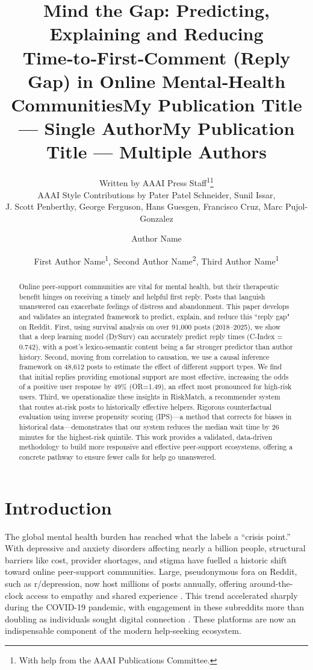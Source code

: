 \documentclass[letterpaper]{article} %
\title{Mind the Gap: Predicting, Explaining and Reducing Time‑to‑First‑Comment (Reply Gap) in Online Mental‑Health Communities}
\author{
    Written by AAAI Press Staff\textsuperscript{\rm 1}\thanks{With help from the AAAI Publications Committee.}\\
    AAAI Style Contributions by Pater Patel Schneider,
    Sunil Issar,\\
    J. Scott Penberthy,
    George Ferguson,
    Hans Guesgen,
    Francisco Cruz\equalcontrib,
    Marc Pujol-Gonzalez\equalcontrib
}
\title{My Publication Title --- Single Author}
\author {
    Author Name
}
\title{My Publication Title --- Multiple Authors}
\author {
    First Author Name\textsuperscript{\rm 1},
    Second Author Name\textsuperscript{\rm 2},
    Third Author Name\textsuperscript{\rm 1}
}
\begin{document}
\maketitle

\begin{abstract}
Online peer-support communities are vital for mental health, but their therapeutic benefit hinges on receiving a timely and helpful first reply. Posts that languish unanswered can exacerbate feelings of distress and abandonment. This paper develops and validates an integrated framework to predict, explain, and reduce this ``reply gap" on Reddit. First, using survival analysis on over 91,000 posts (2018–2025), we show that a deep learning model (DySurv) can accurately predict reply times (C-Index = 0.742), with a post's lexico-semantic content being a far stronger predictor than author history. Second, moving from correlation to causation, we use a causal inference framework on 48,612 posts to estimate the effect of different support types. We find that initial replies providing emotional support are most effective, increasing the odds of a positive user response by 49\% (OR=1.49), an effect most pronounced for high-risk users. Third, we operationalize these insights in RiskMatch, a recommender system that routes at-risk posts to historically effective helpers. Rigorous counterfactual evaluation using inverse propensity scoring (IPS)—a method that corrects for biases in historical data—demonstrates that our system reduces the median wait time by 26 minutes for the highest-risk quintile. This work provides a validated, data-driven methodology to build more responsive and effective peer-support ecosystems, offering a concrete pathway to ensure fewer calls for help go unanswered.
\end{abstract}



\section{Introduction}
The global mental health burden has reached what the \citet{world2022world} labels a “crisis point.” With depressive and anxiety disorders affecting nearly a billion people, structural barriers like cost, provider shortages, and stigma have fuelled a historic shift toward online peer-support communities. Large, pseudonymous fora on Reddit, such as r/depression, now host millions of posts annually, offering around-the-clock access to empathy and shared experience \cite{richard2022scoping}. This trend accelerated sharply during the COVID-19 pandemic, with engagement in these subreddits more than doubling as individuals sought digital connection \cite{zhu2023investigating}. These platforms are now an indispensable component of the modern help-seeking ecosystem.
\end{document}
